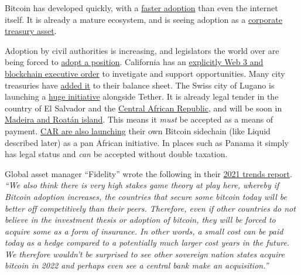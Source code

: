 Bitcoin has developed quickly, with a \href{https://phemex.com/blogs/crypto-bitcoin-s-curve-adoption-curve}{faster adoption} than even the internet itself. It is already a mature ecosystem, and is seeing adoption as a \href{https://bitcointreasuries.net/}{corporate treasury asset}. \par
Adoption by civil authorities is increasing, and legislators the world over are being forced to \href{https://www.politico.com/news/2022/01/16/bitcoin-crashes-the-midterms-527126}{adopt a position}. California has an \href{https://www.gov.ca.gov/2022/05/04/governor-newsom-signs-blockchain-executive-order-to-spur-responsible-web3-innovation-grow-jobs-and-protect-consumers/}{explicitly Web 3 and blockchain executive order} to invetigate and support opportunities. Many city treasuries have \href{https://www.bloomberg.com/news/articles/2022-01-14/rio-de-janeiro-wants-to-become-brazil-s-cryptocurrency-capital}{added it} to their balance sheet. The Swiss city of Lugano is launching a \href{https://twitter.com/Stadicus3000/status/1499656424422526977}{huge initiative} alongside Tether. It is already legal tender in the country of El Salvador\cite{oxford2021salvador} and the \href{https://finance.yahoo.com/news/central-african-republic-passes-bill-180910797.html?}{Central African Republic}, and will be soon in \href{https://www.forbes.com/sites/ninabambysheva/2022/04/07/two-new-territories-are-adopting-bitcoin/?sh=7f014ed2499a}{Madeira and Roatán island}. This means it \textit{must} be accepted as a means of payment. \href{https://www.theblock.co/post/157766/central-african-republic-set-to-launch-sango-bitcoin-sidechain?}{CAR are also launching} their own Bitcoin sidechain (like Liquid described later) as a pan African initiative. In places such as Panama it simply has legal status and \textit{can} be accepted without double taxation.\par 
Global asset manager ``Fidelity'' wrote the following in their \href{https://www.fidelitydigitalassets.com/articles/2021-trends-impact}{2021 trends report}. \textit{``We also think there is very high stakes game theory at play here, whereby if Bitcoin adoption increases, the countries that secure some bitcoin today will be better off competitively than their peers. Therefore, even if other countries do not believe in the investment thesis or adoption of bitcoin, they will be forced to acquire some as a form of insurance. In other words, a small cost can be paid today as a hedge compared to a potentially much larger cost years in the future. We therefore wouldn't be surprised to see other sovereign nation states acquire bitcoin in 2022 and perhaps even see a central bank make an acquisition.''}\par
